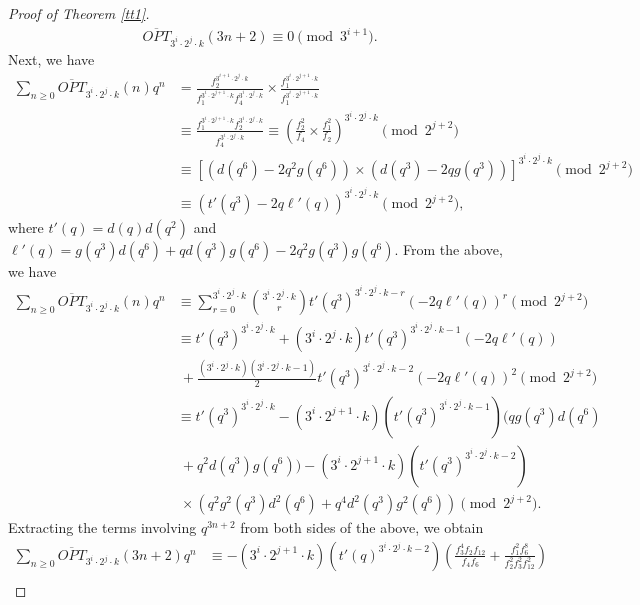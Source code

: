 \documentclass[12pt,reqno,a4paper]{amsart}
\numberwithin{equation}{section}
\begin{document}
\begin{proof}[Proof of Theorem \ref{tt1}]
    \begin{align}
       \label{R14} \overline{OPT}_{3^i\cdot 2^j\cdot k}(3n+2)\equiv 0\pmod{3^{i+1}}.
    \end{align}
    Next, we have
      \begin{align*}
        \sum_{n\geq 0}\overline{OPT}_{3^i\cdot 2^j\cdot k}(n)q^n&= \frac{f_2^{3^{i+1}\cdot 2^j\cdot k}}{f_1^{3^i\cdot 2^{j+1}\cdot k}f_4^{3^i\cdot 2^j\cdot k}}\times \frac{f_1^{3^i\cdot 2^{j+1}\cdot k}}{f_1^{3^i\cdot 2^{j+1}\cdot k}}\\
        &\equiv \frac{f_1^{3^i\cdot 2^{j+1}\cdot k}f_2^{3^{i}\cdot 2^j\cdot k}}{f_4^{3^i\cdot 2^j\cdot k}}\equiv \left(\frac{f_2^2}{f_4}\times \frac{f_1^2}{f_2}\right)^{3^{i}\cdot 2^j\cdot k}\pmod{2^{j+2}}\\
        & \equiv \left[(d(q^6)-2q^2g(q^6))\times (d(q^3)-2qg(q^3))\right]^{3^{i}\cdot 2^j\cdot k} \pmod{2^{j+2}}\\
           & \equiv  \left( t'(q^3)-2q\ell'(q)\right)^{3^{i}\cdot 2^j\cdot k}\pmod{2^{j+2}},
    \end{align*}
    where $t'(q)=d(q)d(q^{2})$ and $\ell'(q)=g(q^3)d(q^{6})+qd(q^3)g(q^{6})-2q^2g(q^3)g(q^{6})$. From the above, we have
  \begin{align}
        \sum_{n\geq 0}\overline{OPT}_{3^i\cdot 2^j\cdot k}(n)q^n&\equiv \sum_{r=0}^{3^{i}\cdot 2^j\cdot k}\binom{3^{i}\cdot 2^j\cdot k}{r}t'(q^3)^{3^{i}\cdot 2^j\cdot k-r}(-2q\ell'(q))^r\pmod{2^{j+2}}\nonumber\\
         & \equiv  t'(q^3)^{3^{i}\cdot 2^j\cdot k}+(3^{i}\cdot 2^j\cdot k)t'(q^3)^{3^{i}\cdot 2^j\cdot k-1}(-2q\ell'(q))\nonumber\\
         &~+\frac{(3^{i}\cdot 2^j\cdot k)(3^{i}\cdot 2^j\cdot k-1)}{2} t'(q^3)^{3^{i}\cdot 2^j\cdot k-2}(-2q\ell'(q))^2\pmod{2^{j+2}}\nonumber\\
         & \equiv t'(q^3)^{3^{i}\cdot 2^j\cdot k}-(3^{i}\cdot 2^{j+1}\cdot k)(t'(q^3)^{3^{i}\cdot 2^j\cdot k-1})\bigl(qg(q^{3})d(q^6)\nonumber\\&~+q^2d(q^{3})g(q^6)\bigr)-(3^{i}\cdot 2^{j+1}\cdot k)(t'(q^3)^{3^{i}\cdot 2^j\cdot k-2})\nonumber\\ & ~\times \left(q^2g^2(q^{3})d^2(q^6)+q^4d^2(q^{3})g^2(q^6)\right)\pmod{2^{j+2}}.\label{R3}
        \end{align}
    Extracting the terms involving $q^{3n+2}$ from both sides of the above, we obtain
    \begin{align}
        \sum_{n\geq 0} \overline{OPT}_{3^i\cdot 2^j\cdot k}(3n+2)q^n&\equiv -(3^{i}\cdot 2^{j+1}\cdot k)(t'(q)^{3^{i}\cdot 2^j\cdot k-2})\left(\frac{f_3^4f_2f_{12}}{f_4f_6}+\frac{f_1^2f_6^8}{f_2^2f_3^2f_{12}^2}\right)\nonumber\\

\end{align}
\end{proof}
\end{document}
